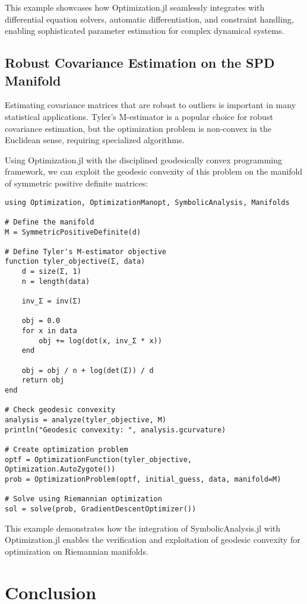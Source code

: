 This example showcases how Optimization.jl seamlessly integrates with differential equation solvers, automatic differentiation, and constraint handling, enabling sophisticated parameter estimation for complex dynamical systems.

\subsection{Robust Covariance Estimation on the SPD Manifold}

Estimating covariance matrices that are robust to outliers is important in many statistical applications. Tyler's M-estimator is a popular choice for robust covariance estimation, but the optimization problem is non-convex in the Euclidean sense, requiring specialized algorithms.

Using Optimization.jl with the disciplined geodesically convex programming framework, we can exploit the geodesic convexity of this problem on the manifold of symmetric positive definite matrices:

\begin{verbatim}
using Optimization, OptimizationManopt, SymbolicAnalysis, Manifolds

# Define the manifold
M = SymmetricPositiveDefinite(d)

# Define Tyler's M-estimator objective
function tyler_objective(Σ, data)
    d = size(Σ, 1)
    n = length(data)
    
    inv_Σ = inv(Σ)
    
    obj = 0.0
    for x in data
        obj += log(dot(x, inv_Σ * x))
    end
    
    obj = obj / n + log(det(Σ)) / d
    return obj
end

# Check geodesic convexity
analysis = analyze(tyler_objective, M)
println("Geodesic convexity: ", analysis.gcurvature)

# Create optimization problem
optf = OptimizationFunction(tyler_objective, Optimization.AutoZygote())
prob = OptimizationProblem(optf, initial_guess, data, manifold=M)

# Solve using Riemannian optimization
sol = solve(prob, GradientDescentOptimizer())
\end{verbatim}

This example demonstrates how the integration of SymbolicAnalysis.jl with Optimization.jl enables the verification and exploitation of geodesic convexity for optimization on Riemannian manifolds.

\section{Conclusion}

